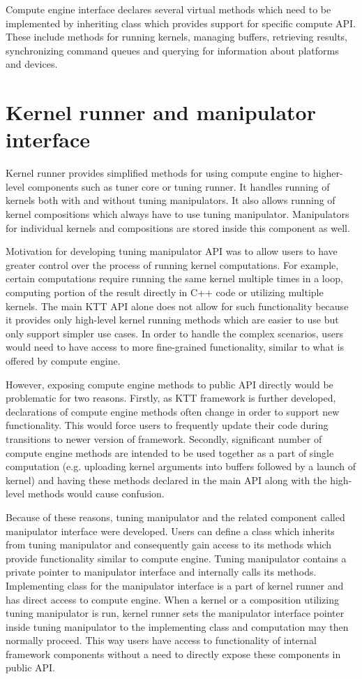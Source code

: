 \documentclass
[
    digital, %
    oneside, %
    table, %
    nolof, %
    nolot, %
    nocover %
]{fithesis3}
\begin{document}
Compute engine interface declares several virtual methods which need to be implemented by inheriting class which provides support for specific compute
API. These include methods for running kernels, managing buffers, retrieving results, synchronizing command queues and querying for information about
platforms and devices.

\section{Kernel runner and manipulator interface}
Kernel runner provides simplified methods for using compute engine to higher-level components such as tuner core or tuning runner. It handles running of
kernels both with and without tuning manipulators. It also allows running of kernel compositions which always have to use tuning manipulator. Manipulators
for individual kernels and compositions are stored inside this component as well.

Motivation for developing tuning manipulator API was to allow users to have greater control over the process of running kernel computations.
For example, certain computations require running the same kernel multiple times in a loop, computing portion of the result directly in C++ code or
utilizing multiple kernels. The main KTT API alone does not allow for such functionality because it provides only high-level kernel running methods which
are easier to use but only support simpler use cases. In order to handle the complex scenarios, users would need to have access to more fine-grained
functionality, similar to what is offered by compute engine.

However, exposing compute engine methods to public API directly would be problematic for two reasons. Firstly, as KTT framework is further developed,
declarations of compute engine methods often change in order to support new functionality. This would force users to frequently update their code
during transitions to newer version of framework. Secondly, significant number of compute engine methods are intended to be used together as a part of
single computation (e.g. uploading kernel arguments into buffers followed by a launch of kernel) and having these methods declared in the main API
along with the high-level methods would cause confusion.

Because of these reasons, tuning manipulator and the related component called manipulator interface were developed. Users can define a class which
inherits from tuning manipulator and consequently gain access to its methods which provide functionality similar to compute engine. Tuning manipulator
contains a private pointer to manipulator interface and internally calls its methods. Implementing class for the manipulator interface is a part of
kernel runner and has direct access to compute engine. When a kernel or a composition utilizing tuning manipulator is run, kernel runner sets the
manipulator interface pointer inside tuning manipulator to the implementing class and computation may then normally proceed. This way users have access
to functionality of internal framework components without a need to directly expose these components in public API. 
\end{document}

